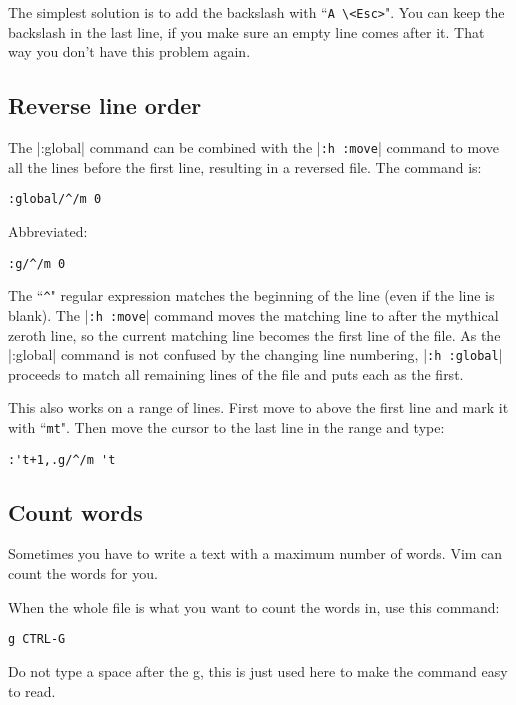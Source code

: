 The simplest solution is to add the backslash with ``\texttt{A \textbackslash{}<Esc>}".
You can keep the backslash in the last line, if you make sure an empty line comes after it.
That way you don't have this problem again.
\subsection{Reverse line order}

The |:global| command can be combined with the |\texttt{:h :move}| command to move all the lines before the first line, resulting in a reversed file.
The command is:

\begin{Verbatim}[samepage=true]
 :global/^/m 0
\end{Verbatim}

Abbreviated:

\begin{Verbatim}[samepage=true]
 :g/^/m 0
\end{Verbatim}

The ``\texttt{\^{}}" regular expression matches the beginning of the line (even if the line is blank).
The |\texttt{:h :move}| command moves the matching line to after the mythical zeroth line, so the current matching line becomes the first line of the file.
As the |:global| command is not confused by the changing line numbering, |\texttt{:h :global}| proceeds to match all remaining lines of the file and puts each as the first.

This also works on a range of lines.
First move to above the first line and mark it with ``\texttt{mt}".
Then move the cursor to the last line in the range and type:

\begin{Verbatim}[samepage=true]
 :'t+1,.g/^/m 't
\end{Verbatim}
\subsection{Count words}
Sometimes you have to write a text with a maximum number of words.
Vim can count the words for you.

When the whole file is what you want to count the words in, use this command:

\begin{Verbatim}[samepage=true]
 g CTRL-G
\end{Verbatim}

Do not type a space after the g, this is just used here to make the command easy to read.

